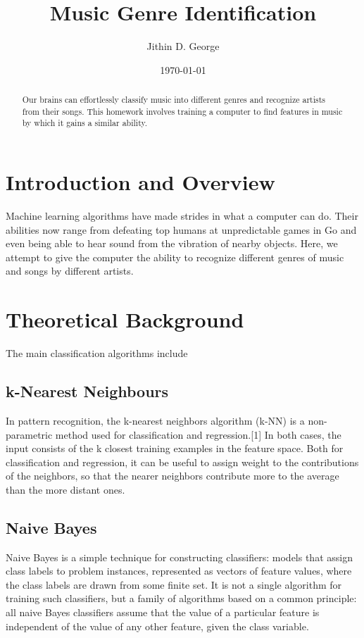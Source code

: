 \documentclass[a4paper]{article}
\title{Music Genre Identification}
\author{Jithin D. George}
\date{\today}
\begin{document}
\maketitle

\begin{abstract}
Our brains can effortlessly classify music into different genres and recognize artists from their songs. This homework involves training a computer to find features in music by which it gains a similar ability.
\end{abstract}

\section{Introduction and Overview}
\label{sec:introduction}

Machine learning algorithms have made strides in what a computer can do. Their abilities now range from defeating top humans at unpredictable games in Go and even being able to hear sound from the vibration of nearby objects. Here, we attempt to give the computer the ability to recognize different genres of music and songs by different artists.
 
\section{Theoretical Background}
\label{sec:theory}

The main classification algorithms include
\subsection{k-Nearest Neighbours}
In pattern recognition, the k-nearest neighbors algorithm (k-NN) is a non-parametric method used for classification and regression.[1] In both cases, the input consists of the k closest training examples in the feature space. Both for classification and regression, it can be useful to assign weight to the contributions of the neighbors, so that the nearer neighbors contribute more to the average than the more distant ones.
\subsection{Naive Bayes}
Naive Bayes is a simple technique for constructing classifiers: models that assign class labels to problem instances, represented as vectors of feature values, where the class labels are drawn from some finite set. It is not a single algorithm for training such classifiers, but a family of algorithms based on a common principle: all naive Bayes classifiers assume that the value of a particular feature is independent of the value of any other feature, given the class variable. 
\end{document}
